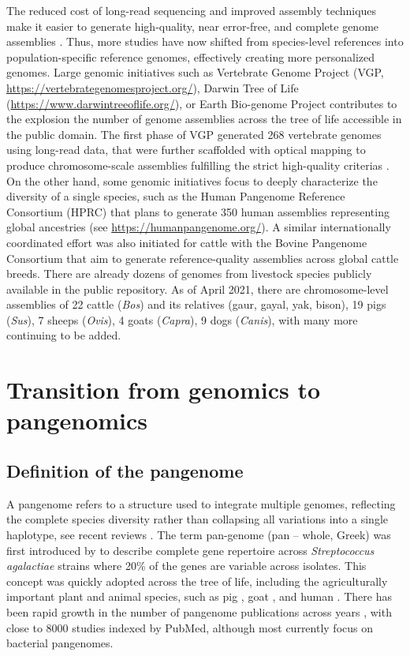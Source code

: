 \documentclass[../main.tex]{subfiles}
\begin{document}
The reduced cost of long-read sequencing and improved assembly techniques  make it easier to generate high-quality, near error-free, and complete genome assemblies \citep{miga2020telomere,logsdon2021structure}. Thus, more studies have now shifted from species-level references into population-specific reference genomes, effectively creating more personalized genomes. Large genomic initiatives such as Vertebrate Genome Project (VGP, \url{https://vertebrategenomesproject.org/}), Darwin Tree of Life (\url{https://www.darwintreeoflife.org/}), or Earth Bio-genome Project \citep{lewin2018earth} contributes to the explosion the number of genome assemblies across the tree of life accessible in the public domain. The first phase of VGP generated 268 vertebrate genomes using long-read data, that were further scaffolded with optical mapping to produce chromosome-scale assemblies fulfilling the strict high-quality criterias \citep{Rhie2021}. On the other hand, some genomic initiatives focus to deeply characterize the diversity of a single species, such as the Human Pangenome Reference Consortium (HPRC) that plans to generate 350 human assemblies representing global ancestries (see \url{https://humanpangenome.org/}). A similar internationally coordinated effort was also initiated for cattle with the Bovine Pangenome Consortium \citep{heaton2021reference} that aim to generate reference-quality assemblies across global cattle breeds. There are already dozens of genomes from livestock species publicly available in the public repository. As of April 2021, there are chromosome-level assemblies of 22 cattle (\emph{Bos}) and its relatives (gaur, gayal, yak, bison), 19 pigs (\emph{Sus}), 7 sheeps (\emph{Ovis}), 4 goats (\emph{Capra}), 9 dogs (\emph{Canis}), with many more continuing to be added.

\section{Transition from genomics to pangenomics}

\subsection*{Definition of the pangenome}

A pangenome refers to a structure used to  integrate multiple genomes, reflecting the complete species diversity rather than collapsing all variations into a single haplotype, see recent reviews \citep{bayer2020plant,sherman2020pan,della2021pan}. The term pan-genome (pan – whole, Greek) was first introduced by \citet{tettelin2005genome} to describe complete gene repertoire across \emph{Streptococcus agalactiae} strains where 20\% of the genes are variable across isolates. This concept was quickly adopted across the tree of life, including the agriculturally important plant and animal species, such as pig \citep{li2017comprehensive,tian2019building}, goat \citep{li2019towards}, and human \citep{duan2019hupan,sherman2019assembly}. There has been rapid growth in the number of pangenome publications across years \citep{bayer2020plant}, with close to 8000 studies indexed by PubMed,  although most currently focus on bacterial pangenomes.  
\end{document}
